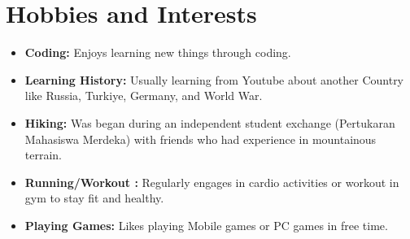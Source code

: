 \documentclass[letterpaper,10pt]{article}
\begin{document}
\section{Hobbies and Interests}
\begin{itemize}[leftmargin=0.15in, label={}]
    \item \textbf{Coding:}
        Enjoys learning new things through coding.

    \item \textbf{Learning History:}
        Usually learning from Youtube about another Country like Russia, Turkiye, Germany, and World War.
    
    \item \textbf{Hiking:}
        Was began during an independent student exchange (Pertukaran Mahasiswa Merdeka) with friends who had experience in mountainous terrain.

    \item \textbf{Running/Workout :}
        Regularly engages in cardio activities or workout in gym to stay fit and healthy.

    \item \textbf{Playing Games:}
        Likes playing Mobile games or PC games in free time.
  \end{itemize}
\end{document}
